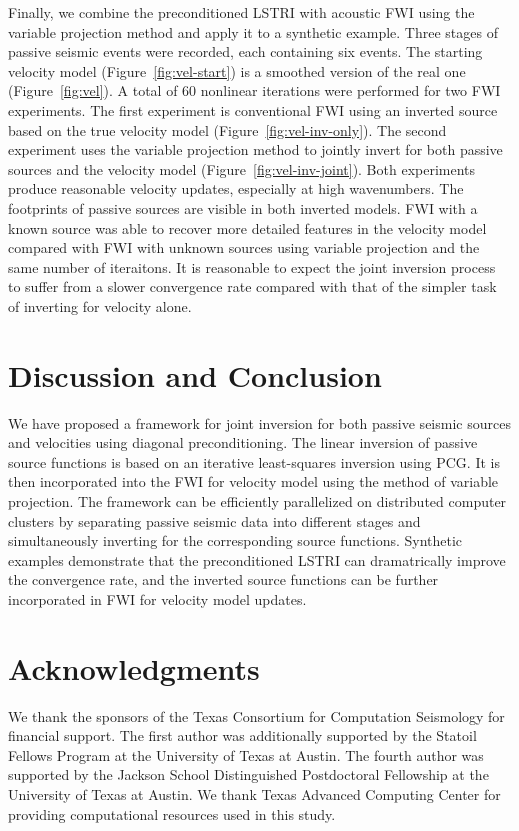 Finally, we combine the preconditioned LSTRI with acoustic FWI using the variable projection method and apply it to a synthetic example. Three stages of passive seismic events were recorded, each containing six events. The starting velocity model (Figure~\ref{fig:vel-start}) is a smoothed version of the real one (Figure~\ref{fig:vel}). A total of $60$ nonlinear iterations were performed for two FWI experiments. The first experiment is conventional FWI using an inverted source based on the true velocity model (Figure~\ref{fig:vel-inv-only}). The second experiment uses the variable projection method to jointly invert for both passive sources and the velocity model (Figure~\ref{fig:vel-inv-joint}). Both experiments produce reasonable velocity updates, especially at high wavenumbers. The footprints of passive sources are visible in both inverted models. FWI with a known source was able to recover more detailed features in the velocity model compared with FWI with unknown sources using variable projection and the same number of iteraitons. It is reasonable to expect the joint inversion process to suffer from a slower convergence rate compared with that of the simpler task of inverting for velocity alone.


\section{Discussion and Conclusion}
We have proposed a framework for joint inversion for both passive seismic sources and velocities using diagonal preconditioning. The linear inversion of passive source functions is based on an iterative least-squares inversion using PCG. It is then incorporated into the FWI for velocity model using the method of variable projection. The framework can be efficiently parallelized on distributed computer clusters by separating passive seismic data into different stages and simultaneously inverting for the corresponding source functions. Synthetic examples demonstrate that the preconditioned LSTRI can dramatrically improve the convergence rate, and the inverted source functions can be further incorporated in FWI for velocity model updates.

\section{Acknowledgments}
We thank the sponsors of the Texas Consortium for Computation Seismology for financial support. The first author was additionally supported by the Statoil Fellows Program at the University of Texas at Austin. The fourth author was supported by the Jackson School Distinguished Postdoctoral Fellowship at the University of Texas at Austin.  We thank Texas Advanced Computing Center for providing computational resources used in this study.


\onecolumn



